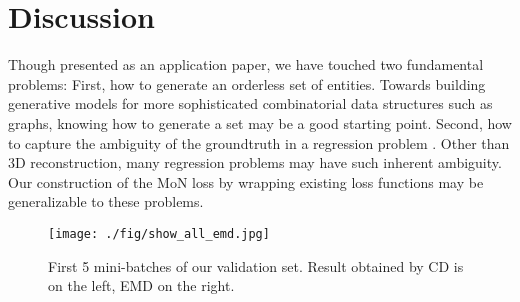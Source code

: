 \documentclass[10pt,twocolumn,letterpaper]{article}
\begin{document}
\section{Discussion}
Though presented as an application paper, we have touched two fundamental problems: First, how to generate an orderless set of entities. Towards building generative models for more sophisticated combinatorial data structures such as graphs, knowing how to generate a set may be a good starting point. Second, how to capture the ambiguity of the groundtruth in a regression problem . Other than 3D reconstruction, many regression problems may have such inherent ambiguity. Our construction of the MoN loss by wrapping existing loss functions may be generalizable to these problems.


\begin{figure*}
	\centering
	\texttt{[image: ./fig/show\_all\_emd.jpg]}
	\caption{First 5 mini-batches of our validation set. Result obtained by CD is on the left, EMD on the right.}
	\label{fig:show_all}
\end{figure*}

%

{

}
\end{document}
